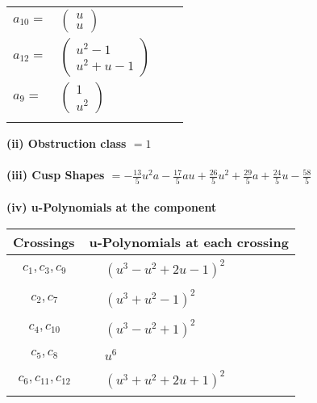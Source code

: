 \documentclass[1p]{elsarticle_modified}
\theoremstyle{definition}
\begin{document}
\begin{tabular}{m{7pt} m{180pt} m{7pt} m{180pt} }
\flushright $a_{10}=$&$\begin{pmatrix}u\\u\end{pmatrix}$ \\
\flushright $a_{12}=$&$\begin{pmatrix}u^2-1\\u^2+u-1\end{pmatrix}$ \\
\flushright $a_{9}=$&$\begin{pmatrix}1\\u^2\end{pmatrix}$\\&\end{tabular}
\flushleft \textbf{(ii) Obstruction class $= 1$}\\~\\
\flushleft \textbf{(iii) Cusp Shapes $= -\frac{13}{5} u^2 a-\frac{17}{5} a u+\frac{26}{5} u^2+\frac{29}{5} a+\frac{24}{5} u-\frac{58}{5}$}\\~\\
\newpage\renewcommand{\arraystretch}{1}
\flushleft \textbf{(iv) u-Polynomials at the component}\newline \\
\begin{tabular}{m{50pt}|m{274pt}}
Crossings & \hspace{64pt}u-Polynomials at each crossing \\
\hline $$\begin{aligned}c_{1},c_{3},c_{9}\end{aligned}$$&$\begin{aligned}
&(u^3- u^2+2 u-1)^2
\end{aligned}$\\
\hline $$\begin{aligned}c_{2},c_{7}\end{aligned}$$&$\begin{aligned}
&(u^3+u^2-1)^2
\end{aligned}$\\
\hline $$\begin{aligned}c_{4},c_{10}\end{aligned}$$&$\begin{aligned}
&(u^3- u^2+1)^2
\end{aligned}$\\
\hline $$\begin{aligned}c_{5},c_{8}\end{aligned}$$&$\begin{aligned}
&u^6
\end{aligned}$\\
\hline $$\begin{aligned}c_{6},c_{11},c_{12}\end{aligned}$$&$\begin{aligned}
&(u^3+u^2+2 u+1)^2
\end{aligned}$\\
\hline
\end{tabular}\\~\\
\end{document}
